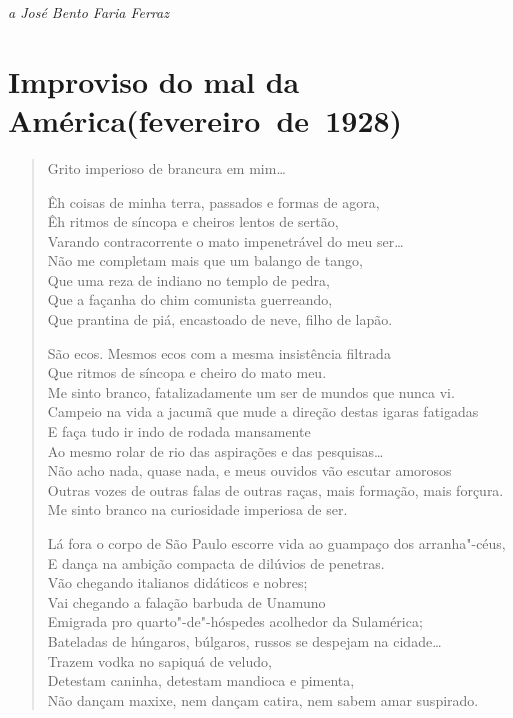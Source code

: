 \begin{flushright}
\emph{a José Bento Faria Ferraz}
\end{flushright}


\section*{Improviso do mal da América\break (fevereiro~de~1928)}

\begin{verse}
Grito imperioso de brancura em mim\ldots{}

Êh coisas de minha terra, passados e formas de agora,\\
Êh ritmos de síncopa e cheiros lentos de sertão,\\
Varando contracorrente o mato impenetrável do meu ser\ldots{}\\
Não me completam mais que um balango de tango,\\
Que uma reza de indiano no templo de pedra,\\
Que a façanha do chim comunista guerreando,\\
Que prantina de piá, encastoado de neve, filho de lapão.

São ecos. Mesmos ecos com a mesma insistência filtrada\\
Que ritmos de síncopa e cheiro do mato meu.\\
Me sinto branco, fatalizadamente um ser de mundos que nunca vi.\\
Campeio na vida a jacumã que mude a direção destas igaras fatigadas\\
E faça tudo ir indo de rodada mansamente\\
Ao mesmo rolar de rio das aspirações e das pesquisas\ldots{}\\
Não acho nada, quase nada, e meus ouvidos vão escutar amorosos\\
Outras vozes de outras falas de outras raças, mais formação, mais forçura.\\
Me sinto branco na curiosidade imperiosa de ser.

Lá fora o corpo de São Paulo escorre vida ao guampaço dos arranha"-céus,\\
E dança na ambição compacta de dilúvios de penetras.\\
Vão chegando italianos didáticos e nobres;\\
Vai chegando a falação barbuda de Unamuno\\
Emigrada pro quarto"-de"-hóspedes acolhedor da Sulamérica;\\
Bateladas de húngaros, búlgaros, russos se despejam na cidade\ldots{}\\
Trazem vodka no sapiquá de veludo,\\
Detestam caninha, detestam mandioca e pimenta,\\
Não dançam maxixe, nem dançam catira, nem sabem amar suspirado.


\end{verse}
